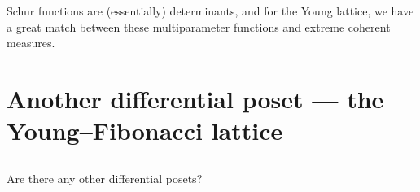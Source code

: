 \documentclass[letterpaper,11pt,oneside,reqno]{article}
\numberwithin{equation}{section}
\theoremstyle{definition}
\begin{document}
Schur functions are (essentially) determinants, and 
for the Young lattice, we have a great match between these multiparameter functions and 
extreme coherent measures.


\section{Another differential poset --- the Young--Fibonacci lattice}

\subsection{}

Are there any other differential posets?



























\end{document}
